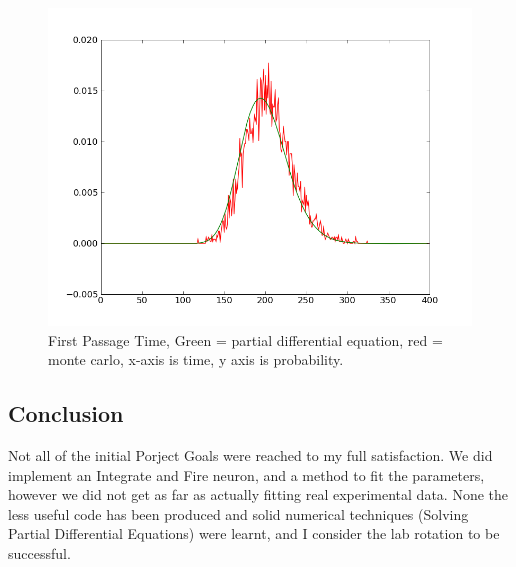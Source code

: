 \documentclass[10pt]{article}
\begin{document}
\begin{figure}[htp]
\centering
\includegraphics[scale=0.75]{fpt.png}
\caption{First Passage Time, Green = partial differential equation,
red = monte carlo, x-axis is time, y axis is probability. }
\end{figure}

\subsection{Conclusion}

Not all of the initial Porject Goals were reached to my full
satisfaction. We did implement an Integrate and Fire
neuron, and a method to fit the parameters, however we did not get as
far as actually fitting real experimental data. None the less 
useful code has been produced and solid numerical techniques (Solving
Partial Differential Equations) were
learnt, and I consider the lab rotation to be successful. 

{  }
\end{document}
